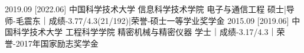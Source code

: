 \documentclass[zh]{resume}
\begin{document}
\makeheader


\begin{educations}

  \education%
    {2019.09}%
    [2022.06]%
    {中国科学技术大学}%
    {信息科学技术学院}%
    {电子与通信工程}%
    {硕士|导师-毛震东｜成绩-3.77/4.3(21/192)|荣誉-硕士一等学业奖学金}
  \separator{0.5ex}
  \education%
    {2015.09}%
    [2019.06]%
    {中国科学技术大学}%
    {工程科学学院}%
    {精密机械与精密仪器}%
    {学士｜成绩-3.17/4.3｜荣誉-2017年国家励志奖学金}
\end{educations}

\end{document}
